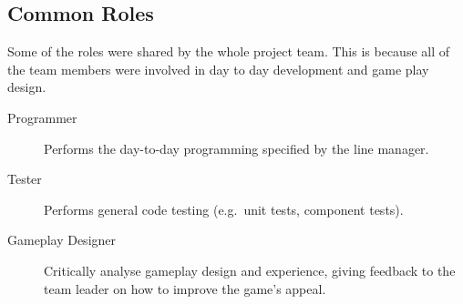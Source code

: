 \subsection{Common Roles}

Some of the roles were shared by the whole project team. This is because all of the
team members were involved in day to day development and game play design.

\begin{description}
    \item[Programmer] Performs the day-to-day programming specified by the line manager.
    \item[Tester] Performs general code testing (e.g.\ unit tests, component tests).
    \item[Gameplay Designer] Critically analyse gameplay design and experience, giving feedback to the team leader on how to improve the game's appeal.
\end{description}
